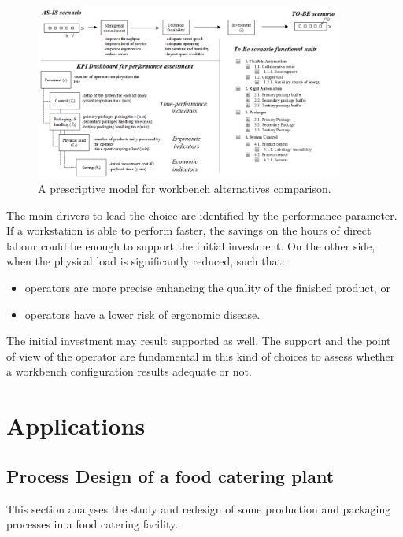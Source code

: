 \begin{figure}[hbt!]
\centering
\includegraphics[width=0.9\textwidth]{sectionProduction/design_process_figures/fig_prod_workstation_design.png}
\captionsetup{type=figure}
\caption{A prescriptive model for workbench alternatives comparison.}
\label{fig_prod_workstation_design}
\end{figure}

The main drivers to lead the choice are identified by the performance parameter. If a workstation is able to perform faster, the savings on the hours of direct labour could be enough to support the initial investment. On the other side, when the physical load is significantly reduced, such that:

\begin{itemize}
    \item operators are more precise enhancing the quality of the finished product, or
    \item operators have a lower risk of ergonomic disease.

\end{itemize}

The initial investment may result supported as well. The support and the point of view of the operator are fundamental in this kind of choices to assess whether a workbench configuration results adequate or not.

\section{Applications}

\subsection{Process Design of a food catering plant}
This section analyses the study and redesign of some production and packaging processes in a food catering facility.

